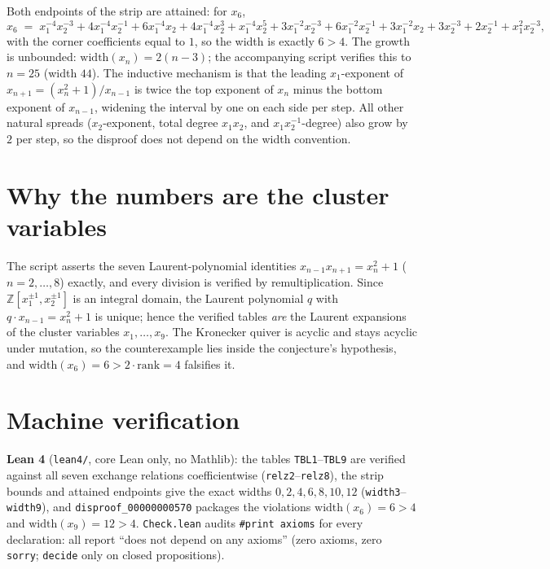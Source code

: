 \documentclass[11pt]{article}
\begin{document}
Both endpoints of the strip are attained: for $x_6$,
\[
x_6 \;=\; x_1^{-4}x_2^{-3} + 4x_1^{-4}x_2^{-1} + 6x_1^{-4}x_2 + 4x_1^{-4}x_2^3
+ x_1^{-4}x_2^5 + 3x_1^{-2}x_2^{-3} + 6x_1^{-2}x_2^{-1} + 3x_1^{-2}x_2
+ 3x_2^{-3} + 2x_2^{-1} + x_1^{2}x_2^{-3},
\]
with the corner coefficients equal to $1$, so the width is exactly
$6 > 4$.  The growth is unbounded: $\mathrm{width}(x_n) = 2(n-3)$; the
accompanying script verifies this to $n=25$ (width $44$).  The inductive
mechanism is that the leading $x_1$-exponent of
$x_{n+1}=(x_n^2+1)/x_{n-1}$ is twice the top exponent of $x_n$ minus the
bottom exponent of $x_{n-1}$, widening the interval by one on each side per
step.  All other natural spreads ($x_2$-exponent, total degree
$x_1x_2$, and $x_1x_2^{-1}$-degree) also grow by $2$ per step, so the
disproof does not depend on the width convention.

\section{Why the numbers are the cluster variables}

The script asserts the seven Laurent-polynomial identities
$x_{n-1}x_{n+1} = x_n^2+1$ ($n=2,\dots,8$) exactly, and every division is
verified by remultiplication.  Since $\mathbb{Z}[x_1^{\pm1},x_2^{\pm1}]$ is
an integral domain, the Laurent polynomial $q$ with $q\cdot x_{n-1} = x_n^2+1$
is unique; hence the verified tables \emph{are} the Laurent expansions of
the cluster variables $x_1,\dots,x_9$.  The Kronecker quiver is acyclic and
stays acyclic under mutation, so the counterexample lies inside the
conjecture's hypothesis, and $\mathrm{width}(x_6)=6>2\cdot\mathrm{rank}=4$
falsifies it.

\section{Machine verification}

\textbf{Lean 4} (\texttt{lean4/}, core Lean only, no Mathlib): the tables
\texttt{TBL1}--\texttt{TBL9} are verified against all seven exchange relations
coefficientwise (\texttt{relz2}--\texttt{relz8}), the strip bounds and attained
endpoints give the exact widths
$0,2,4,6,8,10,12$ (\texttt{width3}--\texttt{width9}), and
\texttt{disproof\_00000000570} packages the violations
$\mathrm{width}(x_6)=6>4$ and $\mathrm{width}(x_9)=12>4$.
\texttt{Check.lean} audits \texttt{\#print axioms} for every declaration:
all report ``does not depend on any axioms'' (zero axioms, zero
\texttt{sorry}; \texttt{decide} only on closed propositions).
\end{document}
